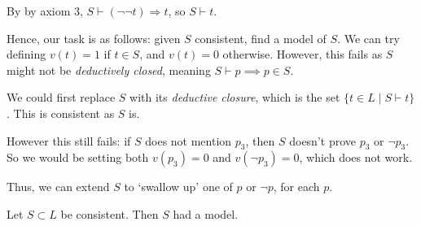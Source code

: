 \documentclass[12pt]{article}
\begin{document}
By by axiom 3, $S \vdash (\neg \neg t) \Rightarrow t$, so $S \vdash t$.

Hence, our task is as follows: given $S$ consistent, find a model of $S$. We can try defining $v(t) = 1$ if $t \in S$, and $v(t) = 0$ otherwise. However, this fails as $S$ might not be \emph{deductively closed}, meaning $S \vdash p \implies p \in S$.

We could first replace $S$ with its \emph{deductive closure}, which is the set $\{t \in L \mid S \vdash t\}$. This is consistent as $S$ is.

However this still fails: if $S$ does not mention $p_3$, then $S$ doesn't prove $p_3$ or $\neg p_3$. So we would be setting both $v(p_3) = 0$ and $v(\neg p_3) = 0$, which does not work.

Thus, we can extend $S$ to `swallow up' one of $p$ or $\neg p$, for each $p$.

\begin{theorem}
	Let $S \subset L$ be consistent. Then $S$ had a model.
\end{theorem}
\end{document}
